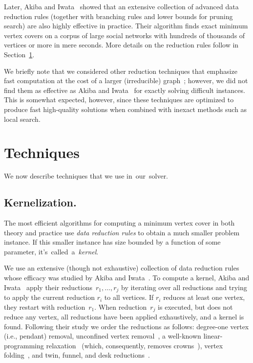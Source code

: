 \documentclass[twoside,leqno,twocolumn]{article}
\begin{document}
Later, Akiba and Iwata~\cite{akiba-tcs-2016} showed that an extensive collection of advanced data reduction rules (together with branching rules and lower bounds for pruning search) are also highly effective in practice. Their algorithm finds exact minimum vertex covers on a corpus of large social networks with hundreds of thousands of vertices or more in mere seconds. More details on the reduction rules follow in Section~\ref{sec:techniques}.

We briefly note that we considered other reduction techniques that emphasize fast computation at the cost of a larger (irreducible) graph~\cite{chang2017computing,strash2016power,DBLP:conf/alenex/Hespe0S18}; however, we did not find them as effective as Akiba and Iwata~\cite{akiba-tcs-2016} for exactly solving difficult instances. This is somewhat expected, however, since these techniques are optimized to produce fast high-quality solutions when combined with inexact methods such as local search.

\section{Techniques}
\label{sec:techniques}
We now describe techniques that we use in~our~solver.
\subsection{Kernelization.}
The most efficient algorithms for computing a minimum vertex cover in both theory and practice use \emph{data reduction rules} to obtain a much smaller problem instance. If this smaller instance has size bounded by a function of some parameter, it's~called~a~\emph{kernel}. 

We use an extensive (though not exhaustive) collection of data reduction rules whose efficacy was studied by Akiba and Iwata~\cite{akiba-tcs-2016}. To compute a kernel, Akiba and Iwata~\cite{akiba-tcs-2016} apply their
reductions~$r_1, \dots, r_j$ by iterating over all reductions and trying to
apply the current reduction $r_i$ to all vertices. If $r_i$ reduces at
least one vertex, they restart with reduction~$r_1$. When reduction~$r_j$ 
is executed, but does not reduce any vertex, all reductions have been applied
exhaustively, and a kernel is found. Following their study we order the reductions
as follows: degree-one vertex (i.e., pendant) removal, unconfined vertex removal~\cite{Xiao201392}, a well-known linear-programming 
relaxation~\cite{iwata-2014,nemhauser-1975} (which, consequently, removes crowns~\cite{abu-khzam-2007}),  vertex folding~\cite{chen1999}, and twin, funnel, and desk reductions~\cite{Xiao201392}.
\end{document}

